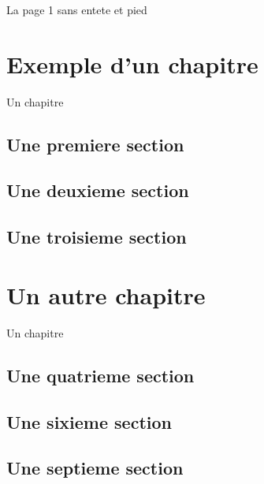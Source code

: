 \documentclass{book}
\begin{document}
	
	\pagestyle{empty} 
	La page 1 sans entete et pied 
	
	\cleardoublepage
	\pagestyle{fancy}
	
	\chapter{Exemple d'un chapitre}
	
	Un chapitre
	
	\newpage 
	
	\section{Une premiere section}
	
	\newpage 
	
	\section{Une deuxieme section}
	
	\section{Une troisieme section}
	
	\chapter{Un autre chapitre}
	
	Un chapitre
	
	\newpage 
	
	\section{Une quatrieme section}
	
	\newpage 
	
	\section{Une sixieme section}
	
	\section{Une septieme section}
	
\end{document}
